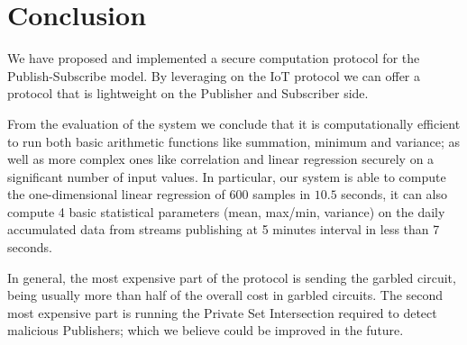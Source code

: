 \section{Conclusion}
\label{sec:conclusion}

We have proposed and implemented a secure computation protocol for the
Publish-Subscribe model.  By leveraging on the IoT \MQTT protocol we can offer
a protocol that is lightweight on the Publisher and Subscriber side.

From the evaluation of the system we conclude that it is computationally
efficient to run both basic arithmetic functions like summation, minimum and
variance; as well as more complex ones like correlation and linear regression
securely on a significant number of input values.
In particular, our system is able to compute the one-dimensional linear regression of 600
samples in $10.5$ seconds, it can also compute 4 basic statistical parameters
(mean, max/min, variance) on the daily accumulated data from streams publishing
at 5 minutes interval in less than 7 seconds.

In general, the most expensive part of the protocol is sending the garbled
circuit, being usually more than half of the overall cost in garbled circuits.
The second most expensive part is running the Private Set Intersection required
to detect malicious Publishers; which we believe could be improved in the future.

